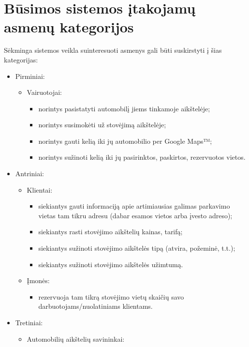 \documentclass{VUMIFPSkursinis}
\begin{document}
\section{Būsimos sistemos įtakojamų asmenų kategorijos}
Sėkminga sistemos veikla suinteresuoti asmenys gali būti suskirstyti į šias kategorijas:

\begin{itemize}[label={}]
	\item Pirminiai:
		\begin{itemize}[label={$\bullet$}]
			\item Vairuotojai:
				\begin{itemize}[label={--}]
					\item norintys pasistatyti automobilį jiems tinkamoje aikštelėje;
					\item norintys susimokėti už stovėjimą aikštelėje;
					\item norintys gauti kelią iki jų automobilio per Google Maps™;
					\item norintys sužinoti kelią iki jų pasirinktos, paskirtos, rezervuotos vietos.
				\end{itemize}
		\end{itemize}
	\item Antriniai:
		\begin{itemize}[label={$\bullet$}]
			\item Klientai:
				\begin{itemize}[label={--}]
					\item siekiantys gauti informaciją apie artimiausias galimas parkavimo vietas tam tikru adresu (dabar esamos vietos arba įvesto adreso);
					\item siekiantys rasti stovėjimo aikštelių kainas, tarifą;
					\item siekiantys sužinoti stovėjimo aikštelės tipą (atvira, požeminė, t.t.);
					\item siekiantys sužinoti stovėjimo aikštelės užimtumą.
				\end{itemize}					
			\item Įmonės:
				\begin{itemize}[label={--}]
					\item rezervuoja tam tikrą stovėjimo vietų skaičių savo darbuotojams/nuolatiniams klientams.
				\end{itemize}
		\end{itemize}
	\item Tretiniai:
		\begin{itemize}[label={$\bullet$}]
			\item Automobilių aikštelių savininkai:

\end{itemize}
\end{itemize}
\end{document}

